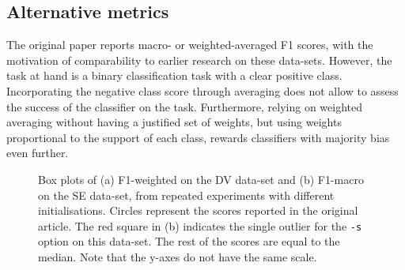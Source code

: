 \subsection{Alternative metrics}

The original paper reports macro- or weighted-averaged F1 scores, with the motivation of comparability to earlier research on these data-sets. However, the task at hand is a binary classification task with a clear positive class.
Incorporating the negative class score through averaging does not allow to assess the success of the classifier on the task. Furthermore, relying on weighted averaging without having a justified set of weights, but using weights proportional to the support of each class, rewards classifiers with majority bias even further.

\begin{figure}
  \rtable
  \hfill
  \caption{\label{fig:data}Box plots of (a) F1-weighted on the DV data-set and (b) F1-macro on the SE data-set, from repeated experiments with different initialisations. Circles represent the scores reported in the original article. The red square in (b) indicates the single outlier for the \texttt{-s} option on this data-set. The rest of the scores are equal to the median. Note that the y-axes do not have the same scale.
  }
\end{figure}

